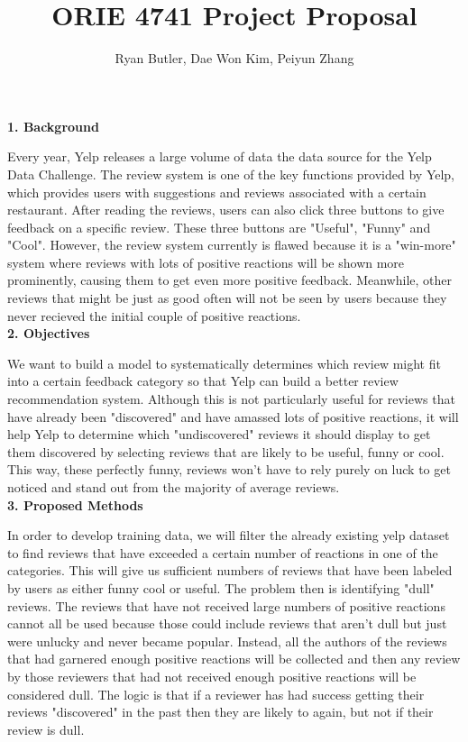 \documentclass[12pt]{article}
\theoremstyle{plain}
\theoremstyle{definition}
\theoremstyle{remark}
\begin{document}
	\title{ORIE 4741 Project Proposal}
	\author{Ryan Butler, Dae Won Kim, Peiyun Zhang}
	\maketitle
\textbf{1. Background}

Every year, Yelp releases a large volume of data the data source for the Yelp Data Challenge. The review system is one of the key functions provided by Yelp, which provides users with suggestions and reviews associated with a certain restaurant. After reading the reviews, users can also click three buttons to give feedback on a specific review. These three buttons are "Useful",  "Funny" and "Cool". However, the review system currently is flawed because it is a "win-more" system where reviews with lots of positive reactions will be shown more prominently, causing them to get even more positive feedback. Meanwhile, other reviews that might be just as good often will not be seen by users because they never recieved the initial couple of positive reactions.\\  

\textbf{2. Objectives}

We want to build a model to systematically determines which review might fit into a certain feedback category so that Yelp can build a better review recommendation system. Although this is not particularly useful for reviews that have already been "discovered" and have amassed lots of positive reactions, it will help Yelp to determine which "undiscovered" reviews it should display to get them discovered by selecting reviews that are likely to be useful, funny or cool. This way, these perfectly funny, reviews won't have to rely purely on luck to get noticed and stand out from the majority of average reviews.\\

\textbf{3. Proposed Methods}

In order to develop training data, we will filter the already existing yelp dataset to find reviews that have exceeded a certain number of reactions in one of the categories. This will give us sufficient numbers of reviews that have been labeled by users as either funny cool or useful. The problem then is identifying "dull" reviews. The reviews that have not received large numbers of positive reactions cannot all be used because those could include reviews that aren't dull but just were unlucky and never became popular. Instead, all the authors of the reviews that had garnered enough positive reactions will be collected and then any review by those reviewers that had not received enough positive reactions will be considered dull. The logic is that if a reviewer has had success getting their reviews "discovered" in the past then they are likely to again, but not if their review is dull.\\
\end{document}
